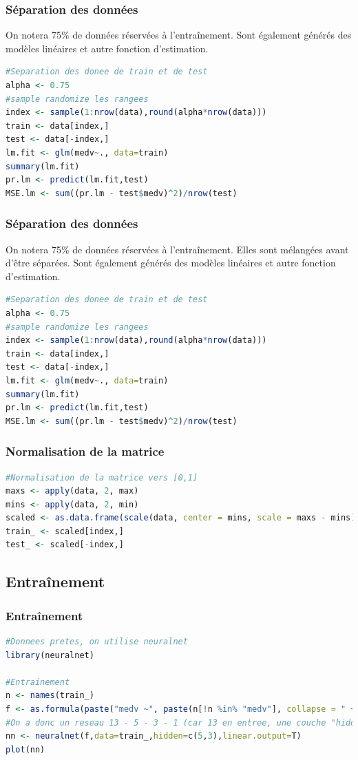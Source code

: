 \documentclass[compress]{beamer}
\begin{document}
\begin{frame}[fragile]
\frametitle{Séparation des données}
On notera 75\% de données réservées à l'entraînement. Sont également générés des modèles linéaires et autre fonction d'estimation.
\begin{lstlisting}[language=R]
#Separation des donee de train et de test
alpha <- 0.75
#sample randomize les rangees
index <- sample(1:nrow(data),round(alpha*nrow(data)))
train <- data[index,]
test <- data[-index,]
lm.fit <- glm(medv~., data=train)
summary(lm.fit)
pr.lm <- predict(lm.fit,test)
MSE.lm <- sum((pr.lm - test$medv)^2)/nrow(test)
\end{lstlisting}
\end{frame}


\begin{frame}[fragile]
\frametitle{Séparation des données}
On notera 75\% de données réservées à l'entraînement. Elles sont mélangées avant d'être séparées. Sont également générés des modèles linéaires et autre fonction d'estimation.
\begin{lstlisting}[language=R]
#Separation des donee de train et de test
alpha <- 0.75
#sample randomize les rangees
index <- sample(1:nrow(data),round(alpha*nrow(data)))
train <- data[index,]
test <- data[-index,]
lm.fit <- glm(medv~., data=train)
summary(lm.fit)
pr.lm <- predict(lm.fit,test)
MSE.lm <- sum((pr.lm - test$medv)^2)/nrow(test)
\end{lstlisting}
\end{frame}

\begin{frame}[fragile]
\frametitle{Normalisation de la matrice}
\begin{lstlisting}[language=R]
#Normalisation de la matrice vers [0,1]
maxs <- apply(data, 2, max) 
mins <- apply(data, 2, min)
scaled <- as.data.frame(scale(data, center = mins, scale = maxs - mins))
train_ <- scaled[index,]
test_ <- scaled[-index,]
\end{lstlisting}
\end{frame}

\subsection{Entraînement}
\begin{frame}[fragile]
\frametitle{Entraînement}
\begin{lstlisting}[language=R]
#Donnees pretes, on utilise neuralnet
library(neuralnet)
	
#Entrainement
n <- names(train_)
f <- as.formula(paste("medv ~", paste(n[!n %in% "medv"], collapse = " + ")))
#On a donc un reseau 13 - 5 - 3 - 1 (car 13 en entree, une couche "hidden" de 5, une couche "hidden" de 3 et la sortie)
nn <- neuralnet(f,data=train_,hidden=c(5,3),linear.output=T)
plot(nn)
\end{lstlisting}
\end{frame}
\end{document}
